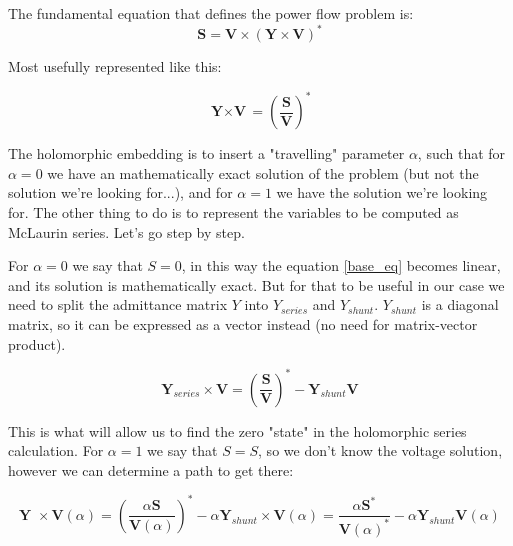 \documentclass[nols,a4paper,twoside,notoc,fleqn]{tufte-book}
\begin{document}
The fundamental equation that defines the power flow problem is:
\begin{equation}
\textbf{S} = \textbf{V} \times (\textbf{Y} \times \textbf{V})^*
\end{equation}

Most usefully represented like this:


\begin{equation}
{\textbf{Y} \times \textbf{V}} = \left(\frac{\textbf{S}}{\textbf{V}}\right)^* 
\label{base_eq}
\end{equation}


The holomorphic embedding is to insert a "travelling" parameter $\alpha$, such that for $\alpha=0$ we have an mathematically exact solution of the problem (but not the solution we're looking for...), and for $\alpha=1$ we have the solution we're looking for. The other thing to do is to represent the variables to be computed as McLaurin series. Let's go step by step.\newline

For $\alpha=0$ we say that $S=0$, in this way the equation \ref{base_eq} becomes linear, and its solution is mathematically exact. But for that to be useful in our case we need to split the admittance matrix $Y$ into $Y_{series}$ and $Y_{shunt}$. $Y_{shunt}$ is a diagonal matrix, so it can be expressed as a vector instead (no need for matrix-vector product).

\begin{equation}
\textbf{Y}_{series} \times \textbf{V} = \left(\frac{\textbf{S}}{\textbf{V}}\right)^* - \textbf{Y}_{shunt} \textbf{V}
\label{base_eq_alpha_0}
\end{equation}

This is what will allow us to find the zero "state" in the holomorphic series calculation. For $\alpha=1$ we say that $S=S$, so we don't know the voltage solution, however we can determine a path to get there:

\begin{equation}
{\textbf{Y }\times \textbf{V}( \alpha )} = \left(\frac{ \alpha\textbf{S}}{\textbf{V}( \alpha )}\right)^* - \alpha \textbf{Y}_{shunt} \times \textbf{V}( \alpha ) = \frac{ \alpha\textbf{S}^*}{\textbf{V}( \alpha )^*} - \alpha \textbf{Y}_{shunt} \textbf{V}( \alpha )
\label{base_eq_embedded}
\end{equation}
\end{document}
